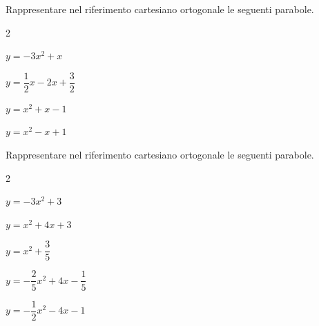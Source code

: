 \begin{esercizio}
\label{ese:4.7}
Rappresentare nel riferimento cartesiano ortogonale le seguenti parabole.

\begin{htmulticols}{2}
\begin{enumeratea}
\item \( y=-3x^2+x \)
\item \( y=\dfrac 1 2x-2x+\dfrac 3 2 \)
\item \( y=x^2+x-1 \)
\item \( y=x^2-x+1 \)
\end{enumeratea}
\end{htmulticols}
\end{esercizio}

\begin{esercizio}
\label{ese:4.8}
Rappresentare nel riferimento cartesiano ortogonale le seguenti parabole.

\begin{htmulticols}{2}
\begin{enumeratea}
\item \( y=-3x^2+3 \)
\item \( y=x^2+4x+3 \)
\item \( y=x^2+\dfrac 3 5 \)
\item \( y=-\dfrac 2 5x^2+4x-\dfrac 1 5 \)
\item \( y=-\dfrac 1 2 x^2-4x-1 \)
\end{enumeratea}
\end{htmulticols}
\end{esercizio}



